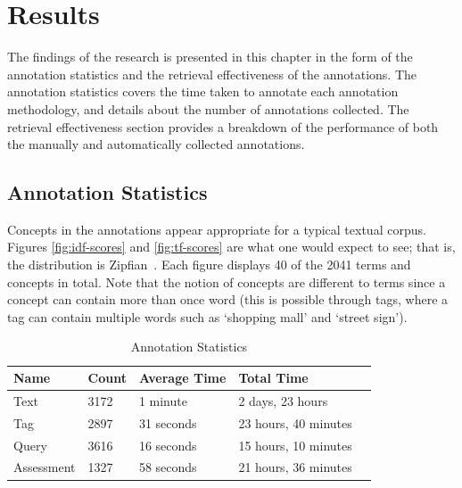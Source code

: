 \chapter{Results}\label{chapter:results}

The findings of the research is presented in this chapter in the form of the annotation statistics and the retrieval effectiveness of the annotations. The annotation statistics covers the time taken to annotate each annotation methodology, and details about the number of annotations collected. The retrieval effectiveness section provides a breakdown of the performance of both the manually and automatically collected annotations.

\section{Annotation Statistics}

Concepts in the annotations appear appropriate for a typical textual corpus. Figures \ref{fig:idf-scores} and \ref{fig:tf-scores} are what one would expect to see; that is, the distribution is Zipfian~\cite{tullo2003modelling}. Each figure displays 40 of the 2041 terms and concepts in total. Note that the notion of concepts are different to terms since a concept can contain more than once word (this is possible through tags, where a tag can contain multiple words such as `shopping mall' and `street sign').

\begin{table}[b]
    \centering
    \begin{tabular}{ | l | l | l | l | p{5cm} |}
    \hline
    Name & Count & Average Time & Total Time \\ \hline
    Text & 3172 & 1 minute & 2 days, 23 hours \\ \hline
    Tag & 2897 & 31 seconds & 23 hours, 40 minutes \\ \hline
    Query & 3616 & 16 seconds & 15 hours, 10 minutes \\ \hline
    Assessment & 1327 & 58 seconds & 21 hours, 36 minutes \\ \hline
    \end{tabular}
    \caption{Annotation Statistics}
    \label{table:annotation-stats}
\end{table}

